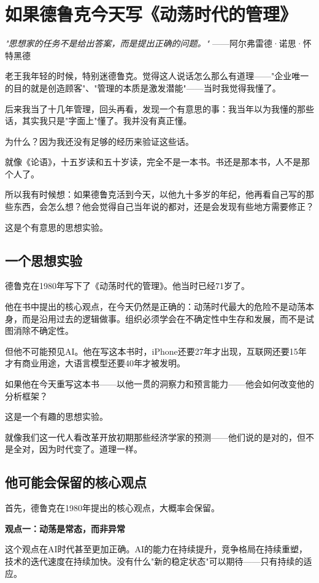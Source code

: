 \chapter{如果德鲁克今天写《动荡时代的管理》}


\textit{"思想家的任务不是给出答案，而是提出正确的问题。"}
——阿尔弗雷德·诺思·怀特黑德


老王我年轻的时候，特别迷德鲁克。觉得这人说话怎么那么有道理——"企业唯一的目的就是创造顾客"、"管理的本质是激发潜能"——当时我觉得我懂了。

后来我当了十几年管理，回头再看，发现一个有意思的事：我当年以为我懂的那些话，其实我只是"字面上"懂了。我并没有真正懂。

为什么？因为我还没有足够的经历来验证这些话。

就像《论语》，十五岁读和五十岁读，完全不是一本书。书还是那本书，人不是那个人了。

所以我有时候想：如果德鲁克活到今天，以他九十多岁的年纪，他再看自己写的那些东西，会怎么想？他会觉得自己当年说的都对，还是会发现有些地方需要修正？

这是个有意思的思想实验。

\section{一个思想实验}


德鲁克在1980年写下了《动荡时代的管理》。他当时已经71岁了。

他在书中提出的核心观点，在今天仍然是正确的：动荡时代最大的危险不是动荡本身，而是沿用过去的逻辑做事。组织必须学会在不确定性中生存和发展，而不是试图消除不确定性。

但他不可能预见AI。他在写这本书时，iPhone还要27年才出现，互联网还要15年才有商业用途，大语言模型还要40年才被发明。

如果他在今天重写这本书——以他一贯的洞察力和预言能力——他会如何改变他的分析框架？

这是一个有趣的思想实验。

就像我们这一代人看改革开放初期那些经济学家的预测——他们说的是对的，但不是全对，因为时代变了。道理一样。

\section{他可能会保留的核心观点}


首先，德鲁克在1980年提出的核心观点，大概率会保留。

\textbf{观点一：动荡是常态，而非异常}

这个观点在AI时代甚至更加正确。AI的能力在持续提升，竞争格局在持续重塑，技术的迭代速度在持续加快。没有什么"新的稳定状态"可以期待——只有持续的适应。

